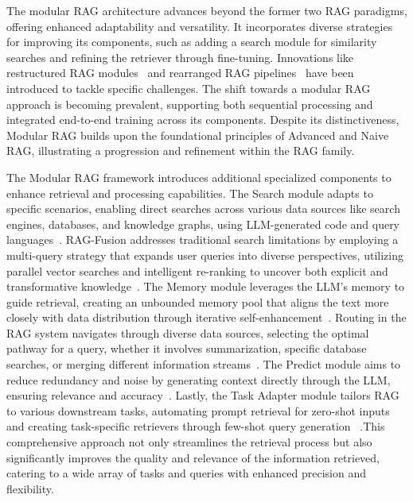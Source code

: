 The modular RAG architecture advances beyond the former two RAG paradigms, offering enhanced adaptability and versatility. It incorporates diverse strategies for improving its components, such as adding a search module for similarity searches and refining the retriever through fine-tuning. Innovations like restructured RAG modules~ and rearranged RAG pipelines~  have been introduced to tackle specific challenges. The shift towards a modular RAG approach is becoming prevalent, supporting both sequential processing and integrated end-to-end training across its components. Despite its distinctiveness, Modular RAG builds upon the foundational principles of Advanced and Naive RAG, illustrating a progression and refinement within the RAG family.

The Modular RAG framework introduces additional specialized components to enhance retrieval and processing capabilities. The Search module adapts to specific scenarios, enabling direct searches across various data sources like search engines, databases, and knowledge graphs, using LLM-generated code and query languages~. RAG-Fusion addresses traditional search limitations by employing a multi-query strategy that expands user queries into diverse perspectives, utilizing parallel vector searches and intelligent re-ranking to uncover both explicit and transformative knowledge~. The Memory module leverages the LLM's memory to guide retrieval, creating an unbounded memory pool that aligns the text more closely with data distribution through iterative self-enhancement~. Routing in the RAG system navigates through diverse data sources, selecting the optimal pathway for a query, whether it involves summarization, specific database searches, or merging different information streams~. The Predict module aims to reduce redundancy and noise by generating context directly through the LLM, ensuring relevance and accuracy~. Lastly, the Task Adapter module tailors RAG to various downstream tasks, automating prompt retrieval for zero-shot inputs and creating task-specific retrievers through few-shot query generation~ .This comprehensive approach not only streamlines the retrieval process but also significantly improves the quality and relevance of the information retrieved, catering to a wide array of tasks and queries with enhanced precision and flexibility.

